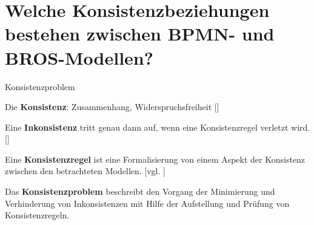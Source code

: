 \section{Welche Konsistenzbeziehungen bestehen zwischen BPMN- und BROS-Modellen?}

\begin{frame}{Konsistenzproblem}

  Die \textbf{Konsistenz}: Zusammenhang, Widerspruchsfreiheit [\cite{duden}]

  Eine \textbf{Inkonsistenz} tritt genau dann auf, wenn eine Konsistenzregel verletzt wird. [\cite{Nuseibeh1996}]

  Eine \textbf{Konsistenzregel} ist eine Formalisierung von einem Aspekt der Konsistenz zwischen den betrachteten Modellen. [vgl. \cite{Nuseibeh1996}]

  Das \textbf{Konsistenzproblem} beschreibt den Vorgang der Minimierung und Verhinderung von Inkonsistenzen mit Hilfe der Aufstellung und Prüfung von Konsistenzregeln.
\end{frame}

